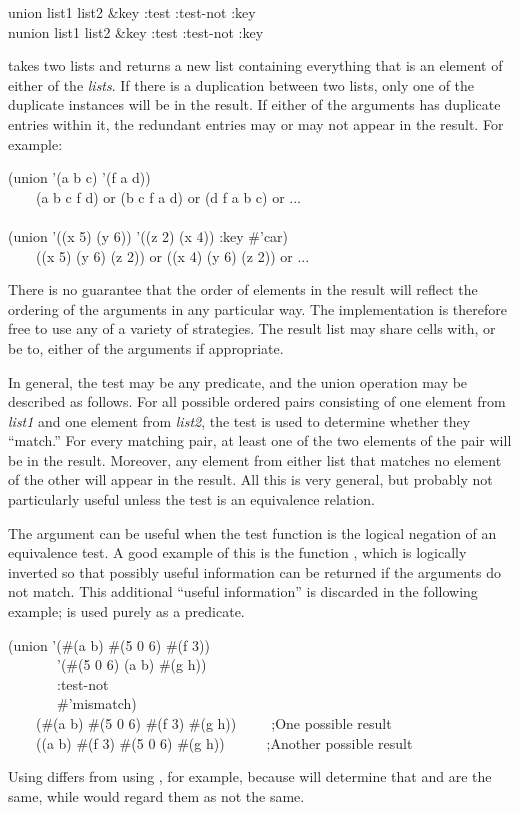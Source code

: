 \begin{defun}[Function]
union list1 list2 &key :test :test-not :key \\
nunion list1 list2 &key :test :test-not :key

 takes two lists and returns a new list containing
everything that is an element of either of the \emph{lists}.
If there is a duplication between two lists,
only one of the duplicate instances will be in the result.
If either of the arguments has duplicate entries within it,
the redundant entries
may or may not appear in the result.
For example:
\begin{lisp}
(union '(a b c) '(f a d)) \\
~~~\EV\ (a b c f d) \textrm{or} (b c f a d) \textrm{or} (d f a b c) \textrm{or} ... \\
 \\
(union '((x 5) (y 6)) '((z 2) (x 4)) :key \#'car) \\
~~~\EV\ ((x 5) (y 6) (z 2)) \textrm{or} ((x 4) (y 6) (z 2)) \textrm{or} ...
\end{lisp}

There is no guarantee that the order of elements in the result will
reflect the ordering of the arguments in any particular way.
The implementation is therefore free to use any of a variety of strategies.
The result list may share cells with, or be  to, either of the arguments
if appropriate.

In general, the test may be any predicate, and the union operation may be
described as follows.  For all possible ordered pairs consisting of one
element from \emph{list1} and one element from \emph{list2}, the test is used
to determine whether they ``match.''  For every matching pair, at least
one of the two elements of the pair will be in the result.  Moreover, any
element from either list that matches no element of the other will appear
in the result.  All this is very general, but probably not particularly
useful unless the test is an equivalence relation.

The  argument can be useful when the test function
is the logical negation of an equivalence test.  A good example
of this is the function , which is logically inverted
so that possibly useful information can be returned if the arguments do not
match.  This additional ``useful information'' is discarded in the following
example;  is used purely as a predicate.
\begin{lisp}
(union '(\#(a b) \#(5 0 6) \#(f 3)) \\
~~~~~~~'(\#(5 0 6) (a b) \#(g h)) \\
~~~~~~~:test-not \\
~~~~~~~\#'mismatch) \\
~~~\EV\ (\#(a b) \#(5 0 6) \#(f 3) \#(g h))~~~~~;\textrm{One possible result} \\
~~~\EV\ ((a b) \#(f 3) \#(5 0 6) \#(g h))~~~~~~;\textrm{Another possible result}
\end{lisp}
Using  differs from using
, for example, because 
will determine that  and  are the same,
while  would regard them as not the same.


\end{defun}
